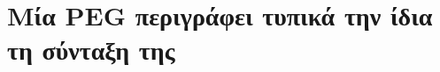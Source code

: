 \documentclass[diploma]{softlab-thesis}
\begin{document}

\mainmatter



















\nocite{*}






\backmatter

\appendix

\chapter{Μία PEG περιγράφει τυπικά την ίδια τη σύνταξη της}
\end{document}
